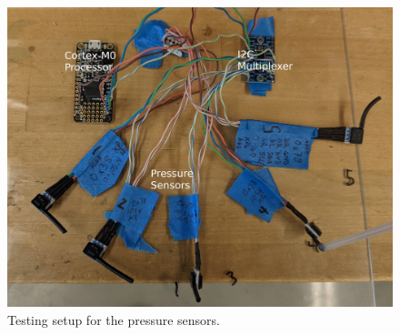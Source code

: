 \documentclass{article}
\begin{document}
\begin{figure}[h!]
	\centering
	\includegraphics[width=\textwidth]{images/pressure-sensor-testbed-annotated}
	\caption{Testing setup for the pressure sensors.}
	\label{fig:pressure-testbed}
\end{figure}




%
%
\end{document}
